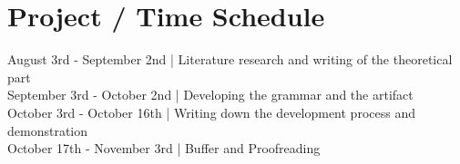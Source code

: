 \section{Project / Time Schedule}
August 3rd - September 2nd | Literature research and writing of the theoretical part\\
September 3rd - October 2nd | Developing the grammar and the artifact\\
October 3rd - October 16th | Writing down the development process and demonstration\\
October 17th - November 3rd | Buffer and Proofreading